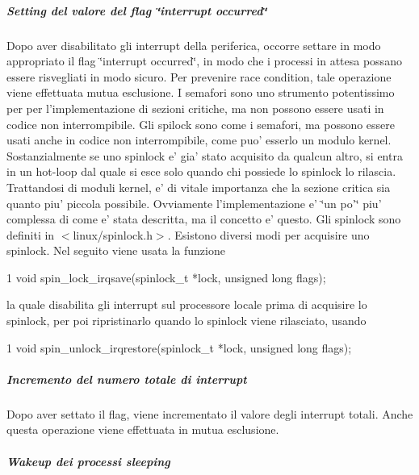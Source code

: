 \subparagraph*{Setting del valore del flag \char`\"{}interrupt occurred\char`\"{}}

Dopo aver disabilitato gli interrupt della periferica, occorre settare in modo appropriato il flag \char`\"{}interrupt occurred\char`\"{}, in modo che i processi in attesa possano essere risvegliati in modo sicuro. Per prevenire race condition, tale operazione viene effettuata mutua esclusione. I semafori sono uno strumento potentissimo per per l'implementazione di sezioni critiche, ma non possono essere usati in codice non interrompibile. Gli spilock sono come i semafori, ma possono essere usati anche in codice non interrompibile, come puo' esserlo un modulo kernel. Sostanzialmente se uno spinlock e' gia' stato acquisito da qualcun altro, si entra in un hot-\/loop dal quale si esce solo quando chi possiede lo spinlock lo rilascia. Trattandosi di moduli kernel, e' di vitale importanza che la sezione critica sia quanto piu' piccola possibile. Ovviamente l'implementazione e' \char`\"{}un po'\char`\"{} piu' complessa di come e' stata descritta, ma il concetto e' questo. Gli spinlock sono definiti in $<$linux/spinlock.\+h$>$. Esistono diversi modi per acquisire uno spinlock. Nel seguito viene usata la funzione 
\begin{DoxyCode}
1 void spin\_lock\_irqsave(spinlock\_t *lock, unsigned long flags);
\end{DoxyCode}
 la quale disabilita gli interrupt sul processore locale prima di acquisire lo spinlock, per poi ripristinarlo quando lo spinlock viene rilasciato, usando 
\begin{DoxyCode}
1 void spin\_unlock\_irqrestore(spinlock\_t *lock, unsigned long flags);
\end{DoxyCode}


\subparagraph*{Incremento del numero totale di interrupt}

Dopo aver settato il flag, viene incrementato il valore degli interrupt totali. Anche questa operazione viene effettuata in mutua esclusione.

\subparagraph*{Wakeup dei processi sleeping}

